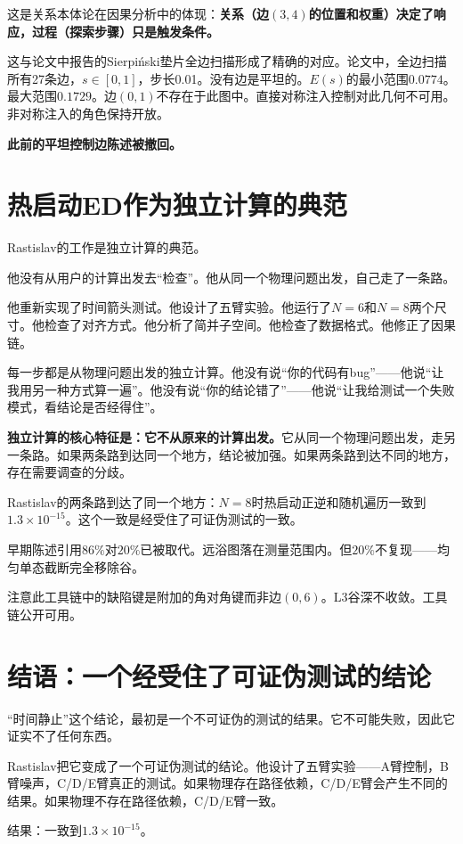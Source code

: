 \documentclass[11pt,a4paper]{book}
\theoremstyle{definition}
\begin{document}
这是关系本体论在因果分析中的体现：\textbf{关系（边$(3,4)$的位置和权重）决定了响应，过程（探索步骤）只是触发条件。}

这与论文中报告的Sierpiński垫片全边扫描形成了精确的对应。论文中，全边扫描所有27条边，$s\in[0,1]$，步长0.01。没有边是平坦的。$E(s)$的最小范围$0.0774$。最大范围$0.1729$。边$(0,1)$不存在于此图中。直接对称注入控制对此几何不可用。非对称注入的角色保持开放。

\textbf{此前的平坦控制边陈述被撤回。}

\section{热启动ED作为独立计算的典范}

Rastislav的工作是独立计算的典范。

他没有从用户的计算出发去“检查”。他从同一个物理问题出发，自己走了一条路。

他重新实现了时间箭头测试。他设计了五臂实验。他运行了$N=6$和$N=8$两个尺寸。他检查了对齐方式。他分析了简并子空间。他检查了数据格式。他修正了因果链。

每一步都是从物理问题出发的独立计算。他没有说“你的代码有bug”——他说“让我用另一种方式算一遍”。他没有说“你的结论错了”——他说“让我给测试一个失败模式，看结论是否经得住”。

\textbf{独立计算的核心特征是：它不从原来的计算出发。}它从同一个物理问题出发，走另一条路。如果两条路到达同一个地方，结论被加强。如果两条路到达不同的地方，存在需要调查的分歧。

Rastislav的两条路到达了同一个地方：$N=8$时热启动正逆和随机遍历一致到$1.3\times10^{-15}$。这个一致是经受住了可证伪测试的一致。

早期陈述引用$86\%$对$20\%$已被取代。远浴图落在测量范围内。但$20\%$不复现——均匀单态截断完全移除谷。

注意此工具链中的缺陷键是附加的角对角键而非边$(0,6)$。L3谷深不收敛。工具链公开可用。

\section{结语：一个经受住了可证伪测试的结论}

“时间静止”这个结论，最初是一个不可证伪的测试的结果。它不可能失败，因此它证实不了任何东西。

Rastislav把它变成了一个可证伪测试的结论。他设计了五臂实验——A臂控制，B臂噪声，C/D/E臂真正的测试。如果物理存在路径依赖，C/D/E臂会产生不同的结果。如果物理不存在路径依赖，C/D/E臂一致。

结果：一致到$1.3\times10^{-15}$。
\end{document}
